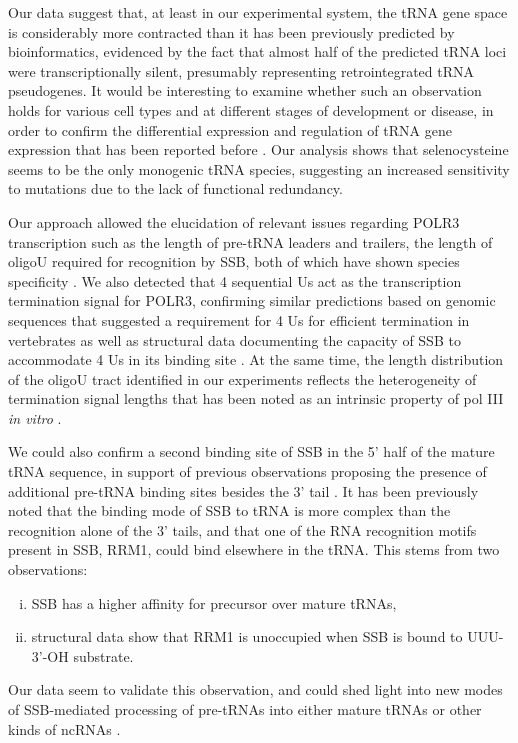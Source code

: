 \documentclass[12pt]{rockefeller}
\begin{document}
Our data suggest that, at least in our experimental system, the tRNA gene space is considerably more contracted than it has been previously predicted by bioinformatics, evidenced by the fact that almost half of the predicted tRNA loci were transcriptionally silent, presumably representing retrointegrated tRNA pseudogenes. It would be interesting to examine whether such an observation holds for various cell types and at different stages of development or disease, in order to confirm the differential expression and regulation of tRNA gene expression that has been reported before \cite{Gingold:2014iz,Goodarzi:2016gd}. Our analysis shows that selenocysteine seems to be the only monogenic tRNA species, suggesting an increased sensitivity to mutations due to the lack of functional redundancy.

Our approach allowed the elucidation of relevant issues regarding POLR3 transcription such as the length of pre-tRNA leaders and trailers, the length of oligoU required for recognition by SSB, both of which have shown species specificity \cite{Arimbasseri:2015jg}. We also detected that 4 sequential Us act as the transcription termination signal for POLR3, confirming similar predictions based on genomic sequences that suggested a requirement for 4 Us for efficient termination in vertebrates \cite{Arimbasseri:2013by,Iben:2012cy} as well as structural data documenting the capacity of SSB to accommodate 4 Us in its binding site \cite{Stefano:1984wp,Teplova:2006dv}. At the same time, the length distribution of the oligoU tract identified in our experiments reflects the heterogeneity of termination signal lengths that has been noted as an intrinsic property of pol III \textit{in vitro} \cite{Arimbasseri:2015jg}.

We could also confirm a second binding site of SSB in the 5’ half of the mature tRNA sequence, in support of previous observations proposing the presence of additional pre-tRNA binding sites besides the 3’ tail \cite{Bayfield:2009cx,Stefano:1984wp}. It has been previously noted that the binding mode of SSB to tRNA is more complex than the recognition alone of the 3’ tails, and that one of the RNA recognition motifs present in SSB, RRM1, could bind elsewhere in the tRNA. This stems from two observations:
\begin{enumerate}[i)]
\item SSB has a higher affinity for precursor over mature tRNAs, 
\item structural data show that RRM1 is unoccupied when SSB is bound to UUU-3’-OH substrate.
\end{enumerate}
Our data seem to validate this observation, and could shed light into new modes of SSB-mediated processing of pre-tRNAs into either mature tRNAs or other kinds of ncRNAs \cite{Hasler:2016ce}. 
\end{document}
